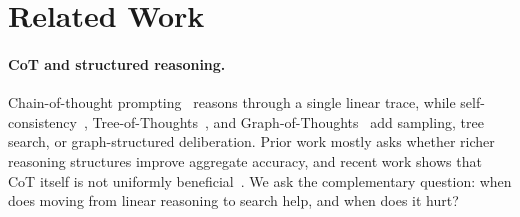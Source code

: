 \documentclass[11pt]{article}
\begin{document}



\section{Related Work}
\label{sec:related}

\paragraph{CoT and structured reasoning.}
Chain-of-thought prompting~\cite{wei2022chain} reasons through a single linear trace, while self-consistency~\cite{wang2022self}, Tree-of-Thoughts~\cite{yao2024tree}, and Graph-of-Thoughts~\cite{besta2024graph} add sampling, tree search, or graph-structured deliberation. Prior work mostly asks whether richer reasoning structures improve aggregate accuracy, and recent work shows that CoT itself is not uniformly beneficial~\cite{meincke2025cot}. We ask the complementary question: when does moving from linear reasoning to search help, and when does it hurt?
\end{document}
